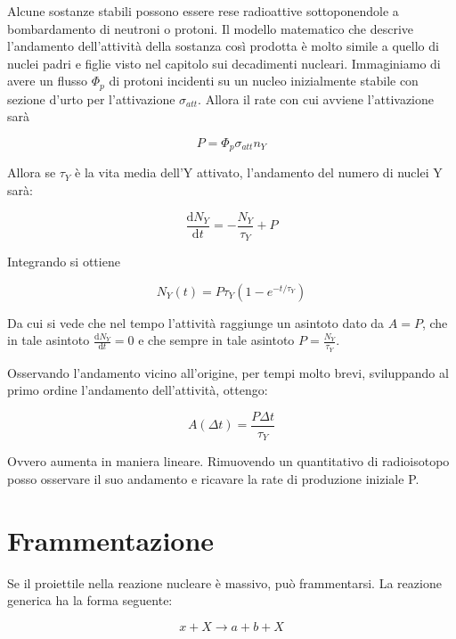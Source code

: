 \documentclass [a4paper, twoside] {book}
\begin{document}
Alcune sostanze stabili possono essere rese radioattive sottoponendole a bombardamento di neutroni o protoni. Il modello matematico che descrive l'andamento dell'attività della sostanza così prodotta è molto simile a quello di nuclei padri e figlie visto nel capitolo sui decadimenti nucleari. 
Immaginiamo di avere un flusso $\Phi_p$ di protoni incidenti su un nucleo inizialmente stabile con sezione d'urto per l'attivazione $\sigma_{att}$. Allora il rate con cui avviene l'attivazione sarà

\begin{equation}
P=\Phi_p \sigma_{att} n_Y
\end{equation}

Allora se $\tau_Y$ è la vita media dell'Y attivato, l'andamento del numero di nuclei Y sarà:

\begin{equation}
\frac{\mathrm{d}N_Y}{\mathrm{d}t}=-\frac{N_Y}{\tau_Y}+P
\end{equation}

Integrando si ottiene

\begin{equation}
N_Y(t)=P\tau_Y(1-e^{-t/\tau_Y})
\end{equation}

Da cui si vede che nel tempo l'attività raggiunge un asintoto dato da $A=P$, che in tale asintoto $\frac{\mathrm{d}N_Y}{\mathrm{d}t}=0$ e che sempre in tale asintoto $P=\frac{N_Y}{\tau_Y}$.

Osservando l'andamento vicino all'origine, per tempi molto brevi, sviluppando al primo ordine l'andamento dell'attività, ottengo:

\begin{equation}
A(\Delta t)=\frac{P \Delta t}{\tau_Y}
\end{equation}

Ovvero aumenta in maniera lineare. Rimuovendo un quantitativo di radioisotopo posso osservare il suo andamento e ricavare la rate di produzione iniziale P.

\section{Frammentazione}

Se il proiettile nella reazione nucleare è massivo, può frammentarsi. La reazione generica ha la forma seguente:

\begin{equation}
x+X \longrightarrow a+b+X
\end{equation}
\end{document}
